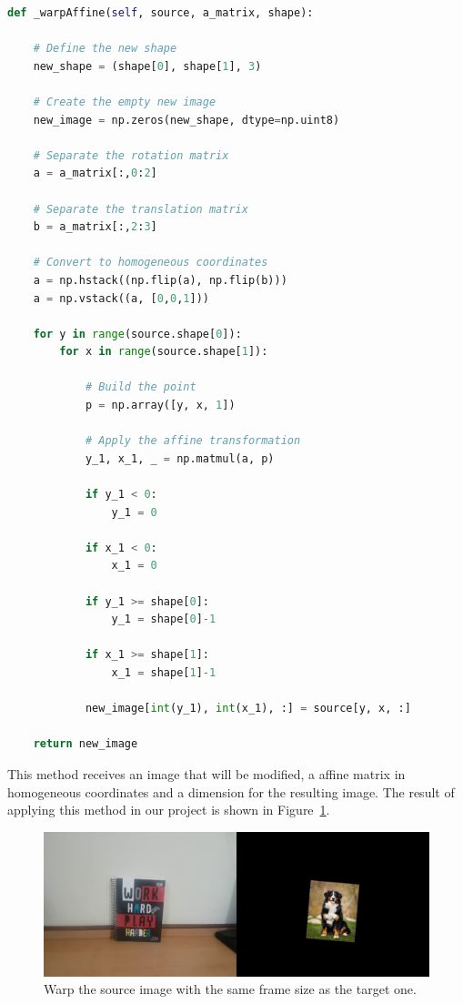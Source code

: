 \documentclass[]{IEEEtran}
\begin{document}
\begin{lstlisting}[language=Python, caption={Warp Affine Method}, label={code:warpAffine}]
def _warpAffine(self, source, a_matrix, shape):
    
    # Define the new shape
    new_shape = (shape[0], shape[1], 3)
    
    # Create the empty new image
    new_image = np.zeros(new_shape, dtype=np.uint8)
    
    # Separate the rotation matrix
    a = a_matrix[:,0:2]
    
    # Separate the translation matrix
    b = a_matrix[:,2:3]
    
    # Convert to homogeneous coordinates
    a = np.hstack((np.flip(a), np.flip(b)))
    a = np.vstack((a, [0,0,1]))
    
    for y in range(source.shape[0]):
        for x in range(source.shape[1]):
            
            # Build the point
            p = np.array([y, x, 1])

            # Apply the affine transformation
            y_1, x_1, _ = np.matmul(a, p)
            
            if y_1 < 0:
                y_1 = 0
                
            if x_1 < 0:
                x_1 = 0
            
            if y_1 >= shape[0]:
                y_1 = shape[0]-1
                
            if x_1 >= shape[1]:
                x_1 = shape[1]-1
            
            new_image[int(y_1), int(x_1), :] = source[y, x, :]
    
    return new_image

\end{lstlisting}

This method receives an image that will be modified, a affine matrix in homogeneous coordinates and a dimension for the resulting image. The result of applying this method in our project is shown in Figure~\ref{fig:paste_0}.

\begin{figure}[H]
     \centering
     \includegraphics[width=0.9\hsize]{img/paste_0.jpg}
     \caption{Warp the source image with the same frame size as the target one.}
     \label{fig:paste_0}
\end{figure}
\end{document}
